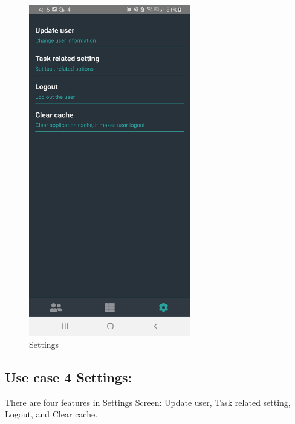 \documentclass[conference]{IEEEtran}
\begin{document}
\begin{figure}[htp] \centering \includegraphics[width=200pt]{Settings.jpg} \caption{Settings} \label{fig:Settings} \end{figure}

\subsection{Use case 4 Settings:}
There are four features in Settings Screen: Update user, Task related setting, Logout, and Clear cache.
\end{document}

